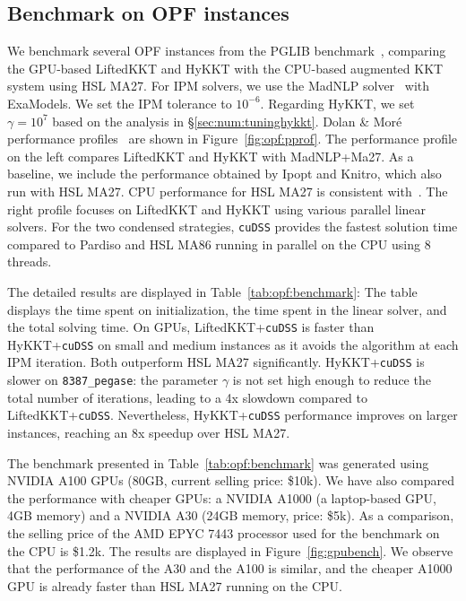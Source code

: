 \subsection{Benchmark on OPF instances}
\label{sec:num:opf}

We benchmark several OPF instances from the PGLIB benchmark~\cite{babaeinejadsarookolaee2019power},
comparing the GPU-based LiftedKKT and HyKKT with the CPU-based augmented KKT system using HSL MA27.
For IPM solvers, we use the MadNLP solver~\cite{shin2021graph} with ExaModels.
We set the IPM tolerance to $10^{-6}$.
Regarding HyKKT, we set $\gamma = 10^7$ based on the analysis in \S\ref{sec:num:tuninghykkt}.
Dolan \& Moré performance profiles~\cite{dolan2002benchmarking} are shown in Figure~\ref{fig:opf:pprof}.
The performance profile on the left compares LiftedKKT and HyKKT with
MadNLP+Ma27. As a baseline, we include the performance obtained by Ipopt and
Knitro, which also run with HSL MA27. CPU performance for HSL MA27
is consistent with~\cite{babaeinejadsarookolaee2019power}.
The right profile focuses on LiftedKKT and HyKKT using
various parallel linear solvers.
For the two condensed strategies, {\tt cuDSS} provides the fastest solution time compared to
Pardiso and HSL MA86 running in parallel on the CPU using 8 threads.

The detailed results are displayed in Table~\ref{tab:opf:benchmark}:
The table displays the time spent on initialization, the time spent in the
linear solver, and the total solving time. On GPUs, LiftedKKT+{\tt cuDSS} is
faster than HyKKT+{\tt cuDSS} on small and medium instances as it avoids the \CG algorithm
at each IPM iteration.
Both outperform HSL MA27 significantly. HyKKT+{\tt cuDSS} is slower
on {\tt 8387\_pegase}: the
parameter $\gamma$ is not set high enough to reduce the total number of \CG
iterations, leading to a 4x slowdown compared to LiftedKKT+{\tt cuDSS}.
Nevertheless, HyKKT+{\tt cuDSS} performance improves on larger
instances, reaching an 8x speedup over HSL MA27.

The benchmark presented in Table~\ref{tab:opf:benchmark} was generated using NVIDIA A100 GPUs (80GB, current selling price: \$10k).
We have also compared the performance
with cheaper GPUs: a NVIDIA A1000 (a laptop-based GPU, 4GB memory) and a NVIDIA A30
(24GB memory, price: \$5k).
As a comparison, the selling price of the AMD EPYC
7443 processor used for the benchmark on the CPU is \$1.2k. The results are
displayed in Figure~\ref{fig:gpubench}. We observe that the performance of the A30
and the A100 is similar, and the cheaper A1000 GPU is already
faster than HSL MA27 running on the CPU.


